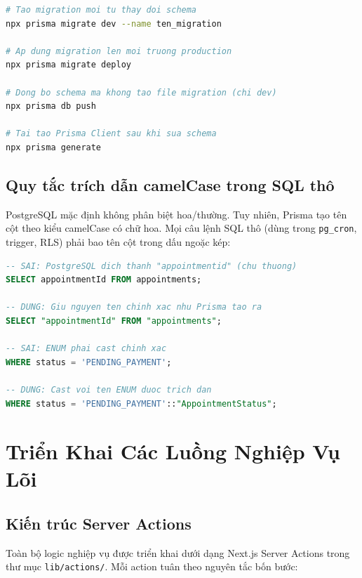 \documentclass[14pt,a4paper]{report}
\begin{document}
\begin{lstlisting}[language=bash, caption={Quy trình migration cơ sở dữ liệu}]
# Tao migration moi tu thay doi schema
npx prisma migrate dev --name ten_migration

# Ap dung migration len moi truong production
npx prisma migrate deploy

# Dong bo schema ma khong tao file migration (chi dev)
npx prisma db push

# Tai tao Prisma Client sau khi sua schema
npx prisma generate
\end{lstlisting}

\subsection{Quy tắc trích dẫn camelCase trong SQL thô}

PostgreSQL mặc định không phân biệt hoa/thường. Tuy nhiên, Prisma
tạo tên cột theo kiểu camelCase có chữ hoa. Mọi câu lệnh SQL thô
(dùng trong \texttt{pg\_cron}, trigger, RLS) phải bao tên cột trong
dấu ngoặc kép:

\begin{lstlisting}[language=SQL, caption={Quy tắc trích dẫn tên cột camelCase trong SQL}]
-- SAI: PostgreSQL dich thanh "appointmentid" (chu thuong)
SELECT appointmentId FROM appointments;

-- DUNG: Giu nguyen ten chinh xac nhu Prisma tao ra
SELECT "appointmentId" FROM "appointments";

-- SAI: ENUM phai cast chinh xac
WHERE status = 'PENDING_PAYMENT';

-- DUNG: Cast voi ten ENUM duoc trich dan
WHERE status = 'PENDING_PAYMENT'::"AppointmentStatus";
\end{lstlisting}

\section{Triển Khai Các Luồng Nghiệp Vụ Lõi}

\subsection{Kiến trúc Server Actions}

Toàn bộ logic nghiệp vụ được triển khai dưới dạng Next.js Server
Actions trong thư mục \texttt{lib/actions/}. Mỗi action tuân theo
nguyên tắc bốn bước:
\end{document}
